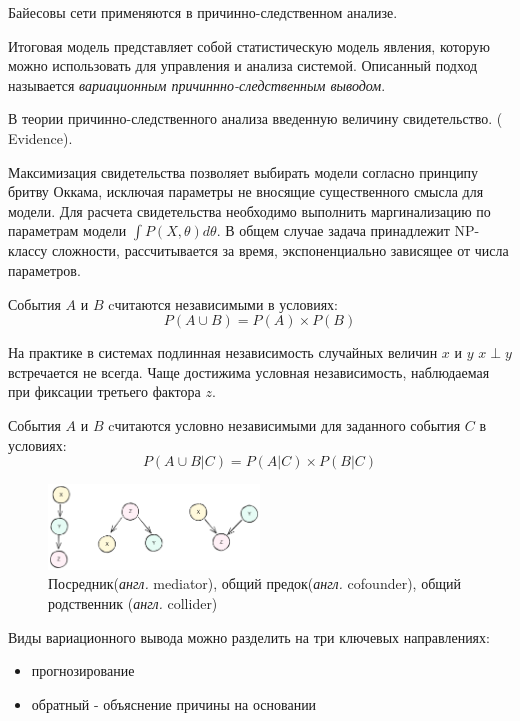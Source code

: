 


Байесовы сети применяются в причинно-следственном анализе.

Итоговая модель представляет собой статистическую модель явления, которую можно использовать для
управления и анализа системой. 
Описанный подход называется \textit{вариационным причиннно-следственным выводом}.

В теории причинно-следственного анализа введенную величину
свидетельство. ( Evidence).

Максимизация свидетельства
позволяет выбирать модели согласно принципу бритву Оккама, исключая
параметры не вносящие существенного смысла для модели. Для расчета свидетельства необходимо выполнить маргинализацию по параметрам
модели $\int P(X, \theta) d\theta$. В общем случае задача принадлежит 
NP-классу сложности, рассчитывается за время, экспоненциально зависящее
от числа параметров. 

 События $A$ и $B$ cчитаются независимыми в условиях:
\begin{equation}
    P(A \cup B) = P(A) \times P(B)
\end{equation}

На практике в системах подлинная независимость случайных величин $x$ и $y$
$x \perp y$ встречается не всегда. Чаще достижима условная независимость, наблюдаемая при
фиксации третьего фактора $z$.

 События $A$ и $B$ cчитаются условно независимыми 
для заданного события $C$ в условиях:
\begin{equation}
    P(A \cup B |C) = P(A|C) \times P(B|C)
\end{equation}

\begin{figure}[h]
    \centering
    \includegraphics[width=0.5\textwidth]{assets/math/discrete/bayes_net.excalidraw.png}
    \caption{Посредник(\textit{англ.} mediator), общий предок(\textit{англ.} cofounder), 
 общий родственник (\textit{англ.} collider) }
    \label{discr_vs_gen}
\end{figure}

Виды вариационного вывода можно разделить на три ключевых направлениях: \begin{itemize}
    \item прогнозирование
    \item обратный - объяснение причины на основании
\end{itemize}

